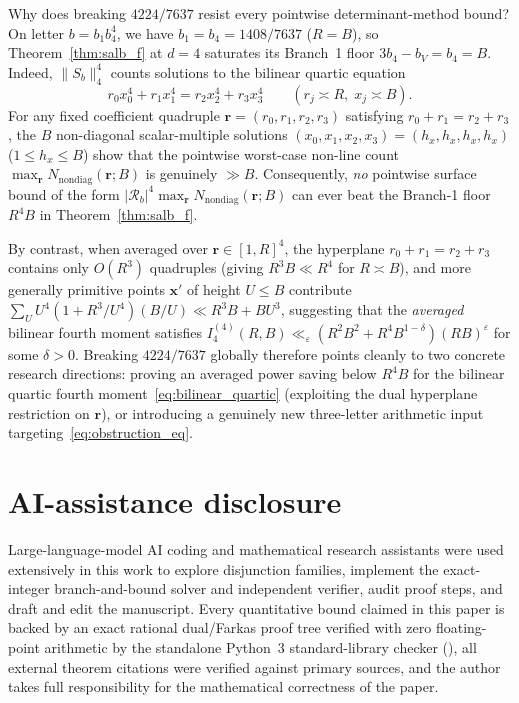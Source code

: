 \documentclass[11pt,a4paper]{amsart}
\theoremstyle{plain}
\theoremstyle{definition}
\theoremstyle{remark}
\newcommand{\eps}{\varepsilon}
\begin{document}
Why does breaking $4224/7637$ resist every pointwise determinant-method bound? On letter $b = b_1 b_4^4$, we have $b_1 = b_4 = 1408/7637$ ($R = B$), so Theorem~\ref{thm:salb_f} at $d = 4$ saturates its Branch~1 floor $3 b_4 - b_V = b_4 = B$. Indeed, $\|S_b\|_4^4$ counts solutions to the bilinear quartic equation
\begin{equation}\label{eq:bilinear_quartic}
  r_0 x_0^4 + r_1 x_1^4 = r_2 x_2^4 + r_3 x_3^4 \qquad (r_j \asymp R,\; x_j \asymp B).
\end{equation}
For any fixed coefficient quadruple $\mathbf{r} = (r_0,r_1,r_2,r_3)$ satisfying $r_0 + r_1 = r_2 + r_3$, the $B$ non-diagonal scalar-multiple solutions $(x_0,x_1,x_2,x_3) = (h_x, h_x, h_x, h_x)$ ($1 \le h_x \le B$) show that the pointwise worst-case non-line count $\max_{\mathbf{r}} N_{\mathrm{nondiag}}(\mathbf{r}; B)$ is genuinely $\gg B$. Consequently, \emph{no} pointwise surface bound of the form $|\mathcal{R}_b|^4 \max_{\mathbf{r}} N_{\mathrm{nondiag}}(\mathbf{r}; B)$ can ever beat the Branch-1 floor $R^4 B$ in Theorem~\ref{thm:salb_f}.

By contrast, when averaged over $\mathbf{r} \in [1, R]^4$, the hyperplane $r_0 + r_1 = r_2 + r_3$ contains only $O(R^3)$ quadruples (giving $R^3 B \ll R^4$ for $R \asymp B$), and more generally primitive points $\mathbf{x}'$ of height $U \le B$ contribute $\sum_{U} U^4 (1 + R^3/U^4)(B/U) \ll R^3 B + B U^3$, suggesting that the \emph{averaged} bilinear fourth moment satisfies $I_4^{(4)}(R, B) \ll_\eps (R^2 B^2 + R^4 B^{1-\delta}) (RB)^\eps$ for some $\delta > 0$. Breaking $4224/7637$ globally therefore points cleanly to two concrete research directions: proving an averaged power saving below $R^4 B$ for the bilinear quartic fourth moment~\eqref{eq:bilinear_quartic} (exploiting the dual hyperplane restriction on $\mathbf{r}$), or introducing a genuinely new three-letter arithmetic input targeting~\eqref{eq:obstruction_eq}.

\section*{AI-assistance disclosure}
Large-language-model AI coding and mathematical research assistants were used extensively in this work to explore disjunction families, implement the exact-integer branch-and-bound solver and independent verifier, audit proof steps, and draft and edit the manuscript. Every quantitative bound claimed in this paper is backed by an exact rational dual/Farkas proof tree verified with zero floating-point arithmetic by the standalone Python~3 standard-library checker (), all external theorem citations were verified against primary sources, and the author takes full responsibility for the mathematical correctness of the paper.
\end{document}
